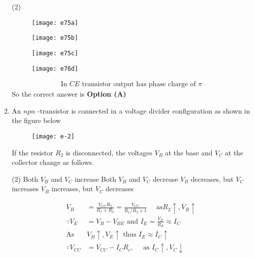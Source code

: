\begin{enumerate}
{	}
\begin{tasks}(2)
\task[\textbf{A.}] \begin{figure}[H]
	\centering
	\texttt{[image: e75a]}
\end{figure}
\task[\textbf{B.}] \begin{figure}[H]
	\centering
	\texttt{[image: e75b]}
\end{figure}
\task[\textbf{C.}] \begin{figure}[H]
	\centering
	\texttt{[image: e75c]}
\end{figure}
\task[\textbf{D.}] \begin{figure}[H]
	\centering
	\texttt{[image: e76d]}
\end{figure}
\end{tasks}
\begin{answer}
\begin{align*}
\text{In $CE$ transistor output has phase charge of $\pi$}
\end{align*}
So the correct answer is \textbf{Option (A)}
\end{answer}
	\item An $npn$ -transistor is connected in a voltage divider configuration as shown in the figure below\\
	\begin{figure}[H]
		\centering
		\texttt{[image: e-2]}
	\end{figure}
	If the resistor $R_{2}$ is disconnected, the voltages $V_{B}$ at the base and $V_{C}$ at the collector change as follows.
{	}
\begin{tasks}(2)
\task[\textbf{A.}]  Both $V_{B}$ and $V_{C}$ increase
\task[\textbf{B.}] Both $V_{B}$ and $V_{C}$ decrease
\task[\textbf{C.}]  $V_{B}$ decreases, but $V_{C}$ increases
\task[\textbf{D.}] $V_{B}$ increases, but $V_{C}$ decreases
\end{tasks}
\begin{answer}
\begin{align*}
V_{B}&=\frac{V_{C C} R_{2}}{R_{1}+R_{2}}=\frac{V_{C C}}{R_{1} / R_{2}+1} \quad\text{ as} R_{2} \uparrow, V_{B} \uparrow\\
\because V_{E}&=V_{B}-V_{B E}\text{ and }I_{E}=\frac{V_{E}}{R_{E}} \approx I_{C}\\
\text{As }&V_{B} \uparrow, V_{E} \uparrow\text{ thus }I_{E} \approx I_{C} \uparrow\\
\because V_{C C}&=V_{C C}-I_{C} R_{c}, \quad\text{ as }I_{C} \uparrow, V_{C} \downarrow

\end{align*}
\end{answer}
\end{enumerate}

